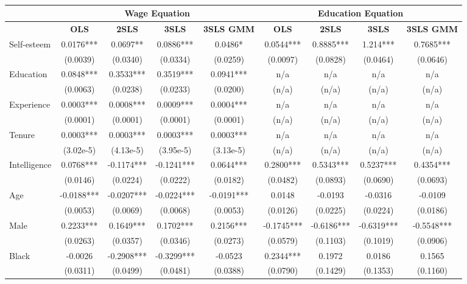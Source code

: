 \documentclass[12pt]{report}
\newcommand{\prbf}[1]{\textbf{#1}}
\begin{document}
\begin{sidewaystable}
\small
\caption{\label{tab:wage06c}}
\vspace{2pt}
\centering\begin{tabular}{lc|c|c|c|c|c|c|c}
\hline
\hline
& \multicolumn{4}{|c|}{Wage Equation} & \multicolumn{4}{|c}{Education Equation}\\
\hline
& \prbf{OLS} & \prbf{2SLS} & \prbf{3SLS} & \prbf{3SLS GMM} & \prbf{OLS} & \prbf{2SLS} & \prbf{3SLS} & \prbf{3SLS GMM}\\
\hline
Self-esteem & 0.0176*** & 0.0697** & 0.0886*** & 0.0486* & 0.0544*** & 0.8885*** & 1.214*** & 0.7685***\\
& (0.0039) & (0.0340) & (0.0334) & (0.0259) & (0.0097) & (0.0828) & (0.0464) & (0.0646)\\
Education & 0.0848*** & 0.3533*** & 0.3519*** & 0.0941*** & n/a & n/a & n/a & n/a\\
& (0.0063) & (0.0238) & (0.0233) & (0.0200) & (n/a) & (n/a) & (n/a) & (n/a)\\
Experience & 0.0003*** & 0.0008*** & 0.0009*** & 0.0004*** & n/a & n/a & n/a & n/a\\
& (0.0001) & (0.0001) & (0.0001) & (0.0001) & (n/a) & (n/a) & (n/a) & (n/a)\\
Tenure & 0.0003*** & 0.0003*** & 0.0003*** & 0.0003*** & n/a & n/a & n/a & n/a\\
& (3.02e-5) & (4.13e-5) & (3.95e-5) & (3.13e-5) & (n/a) & (n/a) & (n/a) & (n/a)\\
Intelligence & 0.0768*** & -0.1174*** & -0.1241*** & 0.0644*** & 0.2800*** & 0.5343*** & 0.5237*** & 0.4354***\\
& (0.0146) & (0.0224) & (0.0222) & (0.0182) & (0.0482) & (0.0893) & (0.0690) & (0.0693)\\
Age & -0.0188*** & -0.0207*** & -0.0224*** & -0.0191*** & 0.0148 & -0.0193 & -0.0316 & -0.0109\\
& (0.0053) & (0.0069) & (0.0068) & (0.0053) & (0.0126) & (0.0225) & (0.0224) & (0.0186)\\
Male & 0.2233*** & 0.1649*** & 0.1702*** & 0.2156*** & -0.1745*** & -0.6186*** & -0.6319*** & -0.5548***\\
& (0.0263) & (0.0357) & (0.0346) & (0.0273) & (0.0579) & (0.1103) & (0.1019) & (0.0906)\\
Black & -0.0026 & -0.2908*** & -0.3299*** & -0.0523 & 0.2344*** & 0.1972 & 0.0186 & 0.1565\\
& (0.0311) & (0.0499) & (0.0481) & (0.0388) & (0.0790) & (0.1429) & (0.1353) & (0.1160)\\

\end{tabular}
\end{sidewaystable}
\end{document}
